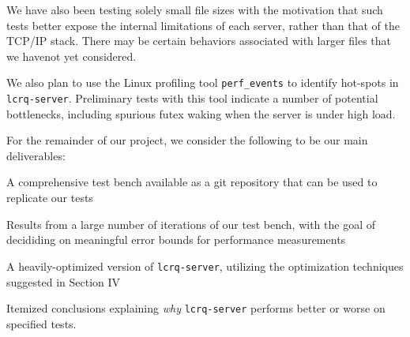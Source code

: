 \documentclass[twoside,10pt]{article}
\begin{document}
\begin{multicols}{2}
We have also been testing solely small file sizes with the motivation
that such tests better expose the internal limitations of each server,
rather than that of the TCP/IP stack. There may be certain behaviors
associated with larger files that we havenot yet considered.

We also plan to use the Linux profiling tool \verb+perf_events+ to
identify hot-spots in \verb+lcrq-server+. Preliminary tests with this
tool indicate a number of potential bottlenecks, including spurious
futex waking when the server is under high load.

For the remainder of our project, we consider the following to be our
main deliverables:

\begin{compactitem}
\item A comprehensive test bench available as a git repository that
  can be used to replicate our tests
\item Results from a large number of iterations of our test bench,
  with the goal of decididing on meaningful error bounds for
  performance measurements
\item A heavily-optimized version of \verb+lcrq-server+, utilizing the
  optimization techniques suggested in Section IV
\item Itemized conclusions explaining \emph{why} \verb+lcrq-server+
  performs better or worse on specified tests.
\end{compactitem}

\end{multicols}

{\small
  
  
}
\end{document}
